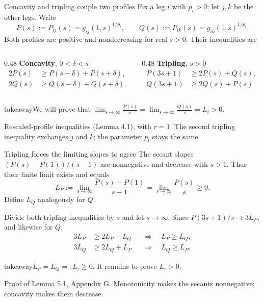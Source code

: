 \documentclass[aspectratio=169,11pt]{beamer}
\newcommand{\source}[1]{\vfill\par{\fontsize{7.5}{9}\selectfont\color{muted}#1\par}}
\newcommand{\takeaway}[1]{\begin{beamercolorbox}[sep=0.65em,wd=\linewidth]{takeaway}#1\end{beamercolorbox}}
\begin{document}
\begin{frame}{Concavity and tripling couple two profiles}
  Fix a leg $i$ with $p_i>0$; let $j,k$ be the other legs. Write
  \[
    P(s):=P_{ij}(s)=g_{ij}(1,s)^{1/p_i},\qquad
    Q(s):=P_{ik}(s)=g_{ik}(1,s)^{1/p_i}.
  \]
  Both profiles are positive and nondecreasing for real $s>0$. Their inequalities are
  \par\medskip
  \begin{columns}[T,onlytextwidth]
    \begin{column}{0.48\textwidth}
      \textbf{Concavity}, $0<\delta<s$
      \[
      \begin{aligned}
        2P(s)&\ge P(s-\delta)+P(s+\delta),\\
        2Q(s)&\ge Q(s-\delta)+Q(s+\delta).
      \end{aligned}
      \]
    \end{column}
    \begin{column}{0.48\textwidth}
      \textbf{Tripling}, $s>0$
      \[
      \begin{aligned}
        P(3s+1)&\ge2P(s)+Q(s),\\
        Q(3s+1)&\ge2Q(s)+P(s).
      \end{aligned}
      \]
    \end{column}
  \end{columns}
  \medskip
  \takeaway{We will prove that $\displaystyle
    \lim_{s\to\infty}\frac{P(s)}s
    =\lim_{s\to\infty}\frac{Q(s)}s=L_i>0$.
  }
  \source{Rescaled-profile inequalities (Lemma 4.1), with $r=1$.
  The second tripling inequality exchanges $j$ and $k$; the parameter $p_i$
  stays the same.}
\end{frame}

\begin{frame}{Tripling forces the limiting slopes to agree}
  The secant slopes $(P(s)-P(1))/(s-1)$ are nonnegative and decrease
  with $s>1$. Thus their finite limit exists and equals
  \[
    L_P:=\lim_{s\to\infty}\frac{P(s)-P(1)}{s-1}
      =\lim_{s\to\infty}\frac{P(s)}s\ge0.
  \]
  Define $L_Q$ analogously for $Q$.
  \par\medskip
  Divide both tripling inequalities by $s$ and let $s\to\infty$.
  Since $P(3s+1)/s\to3L_P$, and likewise for $Q$,
  \[
  \begin{aligned}
    3L_P&\ge2L_P+L_Q &&\Longrightarrow\quad L_P\ge L_Q,\\
    3L_Q&\ge2L_Q+L_P &&\Longrightarrow\quad L_Q\ge L_P.
  \end{aligned}
  \]
  \takeaway{$L_P=L_Q=:L_i\ge0$. It remains to prove $L_i>0$.}
  \source{Proof of Lemma 5.1, Appendix G.
  Monotonicity makes the secants nonnegative; concavity makes them decrease.}
\end{frame}
\end{document}
